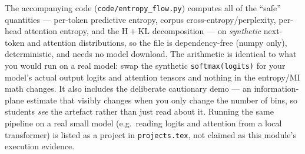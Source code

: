 \documentclass[11pt,letterpaper]{article}
\begin{document}
The accompanying code (\texttt{code/entropy\_flow.py}) computes all of the ``safe''
quantities --- per-token predictive entropy, corpus cross-entropy/perplexity,
per-head attention entropy, and the H${}+{}$KL decomposition --- on
\emph{synthetic} next-token and attention distributions, so the file is
dependency-free (numpy only), deterministic, and needs no model download. The
arithmetic is identical to what you would run on a real model: swap the synthetic
\texttt{softmax(logits)} for your model's actual output logits and attention
tensors and nothing in the entropy/MI math changes. It also includes the
deliberate cautionary demo --- an information-plane estimate that visibly changes
when you only change the number of bins, so students \emph{see} the artefact
rather than just read about it. Running the same pipeline on a real small model
(e.g.\ reading logits and attention from a local transformer) is listed as a
project in \texttt{projects.tex}, not claimed as this module's execution evidence.



\end{document}

